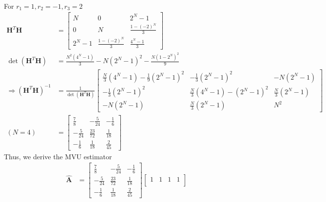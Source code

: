 \documentclass[a4paper,12pt]{article}
\begin{document}
\begin{enumerate}
\begin{align*}
            \end{align*}
            For $r_1=1,r_2=-1,r_3=2$
            \begin{align*}
                \mathbf H^T\mathbf H&=\begin{bmatrix}
                N       &   0       &   2^N-1\\
                0       &   N       &   \frac{1-(-2)^N}{3}\\
                2^N-1   &   \frac{1-(-2)^N}{3}  &   \frac{4^N-1}{3}
                \end{bmatrix}\\
                \det{(\mathbf H^T\mathbf H)}&=\frac{N^2(4^N-1)}{3}-N(2^N-1)^2-\frac{N(1-2^N)^2}{9}\\
                \Longrightarrow (\mathbf H^T\mathbf H)^{-1} &=\frac{1}{\det{(\mathbf H^T\mathbf H)}}\begin{bmatrix}
                \frac{N}{3}(4^N-1)-\frac{1}{9}(2^N-1)^2     &   -\frac{1}{3}(2^N-1)^2           &   -N(2^N-1)\\
                -\frac{1}{3}(2^N-1)^2                       &   \frac{N}{3}(4^N-1)-(2^N-1)^2    &   \frac{N}{3}(2^N-1)\\
                -N(2^N-1)                                   &   \frac{N}{3}(2^N-1)              &   N^2
                \end{bmatrix}\\
                (N=4)
                &=\begin{bmatrix}
                \frac{7}{8}     &   -\frac{5}{24}   &   -\frac{1}{6}\\
                -\frac{5}{24}   &   \frac{23}{72}   &   \frac{1}{18}\\
                -\frac{1}{6}    &   \frac{1}{18}    &   \frac{2}{45}
                \end{bmatrix}
            \end{align*}
            Thus, we derive the MVU estimator
            \begin{align*}
                \hat{\mathbf A}&=\begin{bmatrix}
                \frac{7}{8}     &   -\frac{5}{24}   &   -\frac{1}{6}\\
                -\frac{5}{24}   &   \frac{23}{72}   &   \frac{1}{18}\\
                -\frac{1}{6}    &   \frac{1}{18}    &   \frac{2}{45}
                \end{bmatrix}\begin{bmatrix}
                1   &   1   &   1   &   1\\

\end{bmatrix}
\end{align*}
\end{enumerate}
\end{document}
